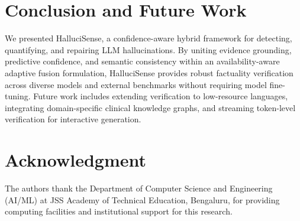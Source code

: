 \documentclass[conference]{IEEEtran}
\begin{document}
\section{Conclusion and Future Work}
\label{sec:conclusion}
We presented HalluciSense, a confidence-aware hybrid framework for detecting, quantifying, and repairing LLM hallucinations. By uniting evidence grounding, predictive confidence, and semantic consistency within an availability-aware adaptive fusion formulation, HalluciSense provides robust factuality verification across diverse models and external benchmarks without requiring model fine-tuning. Future work includes extending verification to low-resource languages, integrating domain-specific clinical knowledge graphs, and streaming token-level verification for interactive generation.

\section*{Acknowledgment}
The authors thank the Department of Computer Science and Engineering (AI/ML) at JSS Academy of Technical Education, Bengaluru, for providing computing facilities and institutional support for this research.



\end{document}
